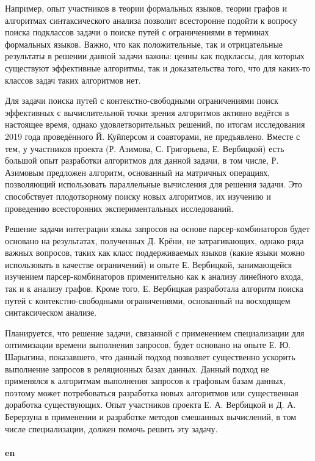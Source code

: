 \documentclass[12pt]{article}  %
\theoremstyle{remark}
\begin{document}
Например, опыт участников в теории формальных языков, теории графов и алгоритмах синтаксического анализа позволит всесторонне подойти к вопросу поиска подклассов задачи о поиске путей с ограничениями в терминах формальных языков. Важно, что как положительные, так и отрицательные результаты в решении данной задачи важны: ценны как подклассы, для которых существуют эффективные алгоритмы, так и доказательства того, что для каких-то классов задач таких алгоритмов нет.

Для задачи поиска путей с контекстно-свободными ограничениями поиск эффективных с вычислительной точки зрения алгоритмов активно ведётся в настоящее время, однако удовлетворительных решений, по итогам исследования 2019 года проведённого Й. Куйперсом и соавторами, не предъявлено.
Вместе с тем, у участников проекта (Р. Азимова, С. Григорьева, Е. Вербицкой) есть большой опыт разработки алгоритмов для данной задачи, в том числе, Р. Азимовым предложен алгоритм, основанный на матричных операциях, позволяющий использовать параллельные вычисления для решения задачи. Это способствует плодотворному поиску новых алгоритмов, их изучению и проведению всесторонних экспериментальных исследований.

Решение задачи интеграции языка запросов на основе парсер-комбинаторов будет основано на результатах, полученных Д. Крёни, не затрагивающих, однако ряда важных вопросов, таких как класс поддерживаемых языков (какие языки можно использовать в качестве ограничений) и опыте Е. Вербицкой, занимающейся изучением парсер-комбинаторов применительно как к анализу линейного входа, так и к анализу графов.
Кроме того, Е. Вербицкая разработала алгоритм поиска путей с контекстно-свободными ограничениями, основанный на восходящем синтаксическом анализе.

Планируется, что решение задачи, связанной с применением специализации для оптимизации времени выполнения запросов, будет основано на опыте Е. Ю. Шарыгина, показавшего, что данный подход позволяет существенно ускорить выполнение запросов в реляционных базах данных. Данный подход не применялся к алгоритмам выполнения запросов к графовым базам данных, поэтому может потребоваться разработка новых алгоритмов или существенная доработка существующих. Опыт участников проекта Е. А. Вербицкой и Д. А. Берерзуна в применении и разработке методов смешанных вычислений, в том числе специализации, должен помочь решить эту задачу.
\\
\\
\textbf{en}\\
\end{document}
